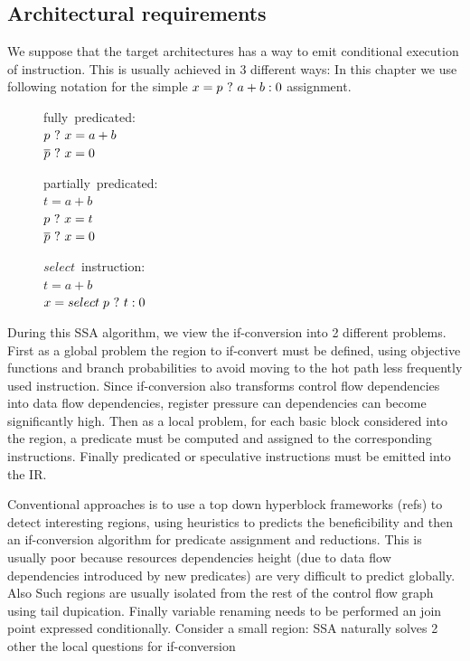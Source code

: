\subsection{Architectural requirements}
We suppose that the target architectures has a way to emit conditional execution of instruction. This is usually achieved in 3 different ways: In this chapter we use following notation for the simple $x = p ~?~ a + b : 0$ assignment.

\begin{figure}
\begin{minipage}[t]{4cm}
\mbox{fully predicated:} \\
$ p ~?~ x = a + b $ \\
$ \overline{p} ~?~ x = 0 $ \\
\end{minipage}
\begin{minipage}[t]{4cm}
\mbox{partially predicated:} \\
$t = a + b $ \\
$p ~?~ x = t $ \\
$\overline{p} ~?~ x = 0 $ \\
\end{minipage}
\begin{minipage}[t]{4cm}
\mbox{$select$ instruction:} \\
$t = a + b $ \\
$x = select \; p ~?~ t : 0 $ \\
\end{minipage}
\end{figure}

During this SSA algorithm, we view the if-conversion into 2 different problems. First as a global problem the region to if-convert must be defined, using objective functions and branch probabilities to avoid moving to the hot path less frequently used instruction. Since if-conversion also transforms control flow dependencies into data flow dependencies, register pressure can dependencies can become significantly high.
Then as a local problem, for each basic block considered into the region, a predicate must be computed and assigned to the corresponding instructions. Finally predicated or speculative instructions must be emitted into the IR.

Conventional approaches is to use a top down hyperblock frameworks (refs) to detect interesting regions, using heuristics to predicts the beneficibility and then an if-conversion algorithm for predicate assignment and reductions. This is usually poor because resources dependencies height (due to data flow dependencies introduced by new predicates) are very difficult to predict globally. Also Such regions are usually isolated from the rest of the control flow graph using tail dupication. Finally variable renaming needs to be performed an join point expressed conditionally. 
Consider a small region: SSA naturally solves 2 other the local questions for if-conversion

